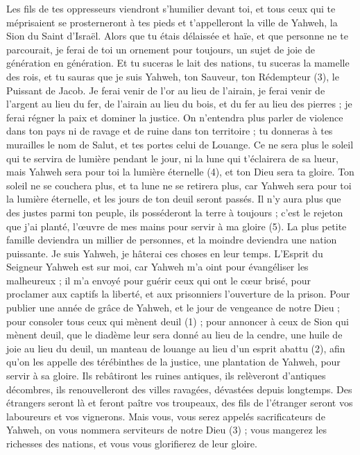\begin{multicols}{2}
Les fils de tes oppresseurs viendront s’humilier devant toi, et tous ceux qui te méprisaient se prosterneront à tes pieds et t'appelleront la ville de Yahweh, la Sion du Saint d'Israël.
Alors que tu étais délaissée et haïe, et que personne ne te parcourait, je ferai de toi un ornement pour toujours, un sujet de joie de génération en génération.
Et tu suceras le lait des nations, tu suceras la mamelle des rois, et tu sauras que je suis Yahweh, ton Sauveur, ton Rédempteur (3), le Puissant de Jacob.
Je ferai venir de l'or au lieu de l'airain, je ferai venir de l'argent au lieu du fer, de l'airain au lieu du bois, et du fer au lieu des pierres ; je ferai régner la paix et dominer la justice.
On n'entendra plus parler de violence dans ton pays ni de ravage et de ruine dans ton territoire ; tu donneras à tes murailles le nom de Salut, et tes portes celui de Louange.
Ce ne sera plus le soleil qui te servira de lumière pendant le jour, ni la lune qui t’éclairera de sa lueur, mais Yahweh sera pour toi la lumière éternelle (4), et ton Dieu sera ta gloire.
Ton soleil ne se couchera plus, et ta lune ne se retirera plus, car Yahweh sera pour toi la lumière éternelle, et les jours de ton deuil seront passés.
Il n’y aura plus que des justes parmi ton peuple, ils posséderont la terre à toujours ; c’est le rejeton que j’ai planté, l’œuvre de mes mains pour servir à ma gloire (5).
La plus petite famille deviendra un millier de personnes, et la moindre deviendra une nation puissante. Je suis Yahweh, je hâterai ces choses en leur temps.
\VerseOne{}L'Esprit du Seigneur Yahweh est sur moi, car Yahweh m'a oint pour évangéliser les malheureux ; il m'a envoyé pour guérir ceux qui ont le cœur brisé, pour proclamer aux captifs la liberté, et aux prisonniers l'ouverture de la prison.
Pour publier une année de grâce de Yahweh, et le jour de vengeance de notre Dieu ; pour consoler tous ceux qui mènent deuil (1) ;
pour annoncer à ceux de Sion qui mènent deuil, que le diadème leur sera donné au lieu de la cendre, une huile de joie au lieu du deuil, un manteau de louange au lieu d’un esprit abattu (2), afin qu’on les appelle des térébinthes de la justice, une plantation de Yahweh, pour servir à sa gloire.
Ils rebâtiront les ruines antiques, ils relèveront d’antiques décombres, ils renouvelleront des villes ravagées, dévastées depuis longtemps.
Des étrangers seront là et feront paître vos troupeaux, des fils de l’étranger seront vos laboureurs et vos vignerons.
Mais vous, vous serez appelés sacrificateurs de Yahweh, on vous nommera serviteurs de notre Dieu (3) ; vous mangerez les richesses des nations, et vous vous glorifierez de leur gloire.

\end{multicols}
